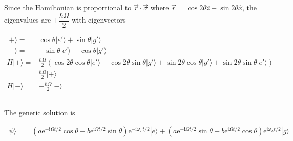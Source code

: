 \documentclass[10pt,fleqn]{article}
\newcommand{\ue}{\mathrm{e}}
\newcommand{\ui}{\mathrm{i}}
\newcommand{\eqar}[1]
{
  \begin{align*}
    #1
  \end{align*}
}
\newcommand{\paren}[1]{{\left({#1}\right)}}
\begin{document}
\subsection{}
Since the Hamiltonian is proportional to $\vec r\cdot\vec\sigma$ where $\vec r=\cos2\theta\hat z+\sin2\theta\hat x$, the eigenvalues are $\pm\dfrac{\hbar\Omega}{2}$ with eigenvectors
\eqar{
  |+\rangle=&\cos\theta|e'\rangle+\sin\theta|g'\rangle\\
  |-\rangle=&-\sin\theta|e'\rangle+\cos\theta|g'\rangle\\
  H|+\rangle=&\frac{\hbar\Omega}{2}\paren{\cos2\theta\cos\theta|e'\rangle-\cos2\theta\sin\theta|g'\rangle+\sin2\theta\cos\theta|g'\rangle+\sin2\theta\sin\theta|e'\rangle}\\
  =&\frac{\hbar\Omega}{2}|+\rangle\\
  H|-\rangle=&-\frac{\hbar\Omega}{2}|-\rangle
}

\subsection{}
The generic solution is
\eqar{
  |\psi\rangle=&\paren{a\ue^{-\ui\Omega t/2}\cos\theta-b\ue^{\ui\Omega t/2}\sin\theta}\ue^{-\ui\omega_Lt/2}|e\rangle+\paren{a\ue^{-\ui\Omega t/2}\sin\theta+b\ue^{\ui\Omega t/2}\cos\theta}\ue^{\ui\omega_Lt/2}|g\rangle
}
\end{document}
